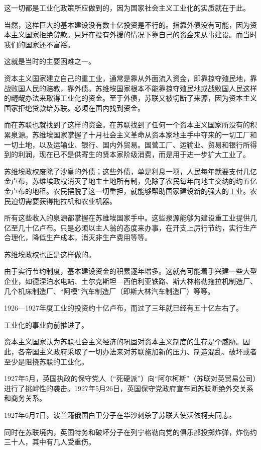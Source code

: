 这一切都是工业化政策所应做到的，因为国家社会主义工业化的实质就在于此。

当然，这样巨大的基本建设没有数十亿投资是不行的。指靠外债没有可能，因为资本主义国家拒绝贷款。只好在投有外援的情况下靠自己的资金来从事建设。而当时我们的国家还不富裕。

这就是当时的主要困难之一。

资本主义国家建立自己的重工业，通常是靠从外面流入资金，即靠掠夺殖民地，靠战败国人民的赔教，靠外债。苏维埃国家根本不能靠掠夺殖民地或战败国人民这样的龌龊办法来取得工业化的资金。至于外债，苏联又被切断了来源，因为资本主义国家拒绝贷款给苏联。必须在国内找到资金。

而在苏联也就找到了这样的资金。在苏联找到了任何一个资本主义国家所没有的积累泉源。苏维埃国家掌握了十月社会主义革命从资本家地主手中夺来的一切工厂和一切土地，以及运输业、银行、国内外贸易。国营工厂、运输业、贸易和银行所得到的利润，现在已不是供寄生的贤本家阶级消费，而是用于进一步扩大工业了。

苏维埃政权废除了沙皇的外债；这些外债，单是利息一项，人民每年就要支付几亿金卢布，苏维埃政权消灭了地主土地所有制，免除了农民每年向地主交纳的约五亿金卢布的地租。农民摆脱了这一切重担，就能够帮助国家建设新的强大的工业。农民迫切需要获得拖拉机和农业机器。

所有这些收入的泉源都掌握在苏维埃国家手中。这些泉源能够为建设重工业提供几亿至几十亿卢布。只是必须以主人翁的态度来办事，在开支上厉行节约，实行生产合理化，降低生产成本，消灭非生产费用等等。

苏维埃政权也正是这样做的。

由于实行节约制度，基本建设资金的积累逐年增多。这就有可能着手兴建一些大型企业，如德涅泊水电站、土尔克斯坦—西伯利亚铁路、斯大林格勒拖拉机制造厂、几个机床制造厂、“阿模”汽车制造厂（即斯大林汽车制造厂）等等。

1926—1927年度工业的投资约十亿卢布，而过了三年就已经有五十亿左右了。

工业化的事业向前推进了。

资本主义国家认为苏联社会主义经济的巩固对资本主义制度的生存是个威胁。因此，各帝国主义政府采取了一切办法来对苏联施加新的压力、制造混乱、破坏或者至少是阻挠苏联的工业化。

1927年5月，英国执政的保守党人（“死硬派”）向“阿尔柯斯”（苏联对英贸易公司）进行了挑衅性的袭击。1927年5月26日，英国保守党政府宣布同苏联断绝外交关系和商务关系。

1927年6月7日，波兰籍俄国白卫分子在华沙刺杀了苏联大使沃依柯夫同志。

同时在苏联境内，英国特务和破坏分子在列宁格勒向党的俱乐部投掷炸弹，炸伤约三十人，其中有几人受重伤。

